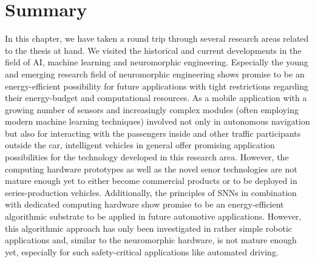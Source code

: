 \section{Summary}
\label{sec:related_work_summary}

In this chapter, we have taken a round trip through several research areas related to the thesis at hand.
We visited the historical and current developments in the field of \ac{AI}, machine learning and neuromorphic engineering.
Especially the young and emerging research field of neuromorphic engineering shows promise to be an energy-efficient possibility for future applications with tight restrictions regarding their energy-budget and computational resources.
As a mobile application with a growing number of sensors and increasingly complex modules (often employing modern machine learning techniques) involved not only in autonomous navigation but also for interacting with the passengers inside and other traffic participants outside the car, intelligent vehicles in general offer promising application possibilities for the technology developed in this research area.
However, the computing hardware prototypes \cite{Furber2014, Akopyan2015, Davies2018} as well as the novel senor technologies \cite{Lichtsteiner2008} are not mature enough yet to either become commercial products or to be deployed in series-production vehicles.
Additionally, the principles of \acp{SNN} in combination with dedicated computing hardware show promise to be an energy-efficient algorithmic substrate to be applied in future automotive applications.
However, this algorithmic approach has only been investigated in rather simple robotic applications \cite{Conradt2014, Stewart2016, Galluppi2014} and, similar to the neuromorphic hardware, is not mature enough yet, especially for such safety-critical applications like automated driving.

